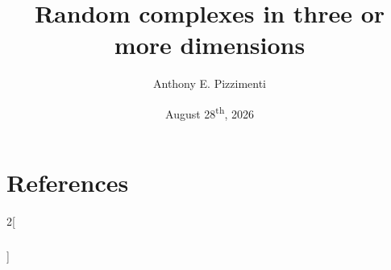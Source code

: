 \documentclass[%
	notheorems,
	noamsthm,
	aspectratio=169,
]{beamer}
\title[Random complexes]{Random complexes in three or more dimensions}
\subtitle[]{}
\author[]{Anthony E. Pizzimenti}
\date{August 28\textsuperscript{th}, 2026}
\begin{document}
	
	
	\section*{References}
		\begin{multicols}{2}[\frametitle{\insertsection} ]
			\sloppy
			\printbibliography
		\end{multicols}
\end{document}
